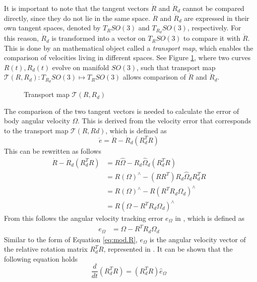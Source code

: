 It is important to note that the tangent vectors $ \dot{R} $ and $ \dot{R}_d $ cannot be compared directly, since they do not lie in the same space. $ \dot{R} $ and $ \dot{R}_d $ are expressed in their own tangent spaces, denoted by $ T_RSO(3)$ and $ T_{R_d}SO(3)$, respectively. For this reason, $ \dot{R}_d $ is transformed into a vector on $ T_RSO(3) $ to compare it with $ \dot{R} $. This is done by an mathematical object called a \textit{transport map}, which enables the comparison of velocities living in different spaces. See Figure \ref{fig:con.transport}, where two curves $ R(t), R_d(t)$ evolve on manifold $ SO(3) $, such that transport map $ \mathcal{T}(R,R_d):T_{R_d}SO(3)\mapsto T_RSO(3) $ allows comparison of $ \dot{R} $ and $ \dot{R}_d $.
\begin{figure}[h!]
	\centering
	\caption{Transport map $ \mathcal{T}(R,R_d) $\label{fig:con.transport}}
\end{figure}		

The comparison of the two tangent vectors is needed to calculate the error of body angular velocity $ \Omega $. This is derived from the velocity error that corresponds to the transport map $ \mathcal{T}(R,Rd)$, which is defined as
\begin{equation}\label{key}
\dot{e}=\dot{R}-\dot{R}_d(R_d^TR)
\end{equation}
This can be rewritten as follows
\begin{equation}\label{key}
\begin{aligned}
\dot{R}-\dot{R}_d(R_d^TR) &=R\hat{\Omega}-R_d\hat{\Omega}_d(R_d^TR) \\
&=R(\Omega)^\wedge-(RR^T)R_d\hat{\Omega}_dR_d^TR\\
&=R(\Omega)^\wedge-R(R^TR_d{\Omega}_d)^\wedge \\
&=R(\Omega-R^TR_d{\Omega}_d)^\wedge 
\end{aligned}
\end{equation}
From this follows the angular velocity tracking error $ e_{\Omega} $ in \BF, which  is defined as
\begin{align}\label{eq:con.eOmega}
e_\Omega&=\Omega- R^TR_d\Omega_d
\end{align}
Similar to the form of Equation \ref{eq:mod.R}, $ e_\Omega $ is the angular velocity vector of the relative rotation matrix $ R_d^TR $, represented in \BF. 
It can be shown that the following equation holds
\begin{equation}\label{key}
\frac{d}{dt}(R^T_dR)=(R_d^TR)\hat{e}_\Omega
\end{equation}

